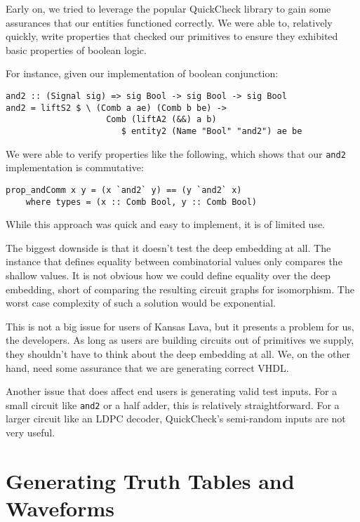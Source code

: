 \documentclass{llncs}
\begin{document}
Early on, we tried to leverage the popular QuickCheck library to gain some
assurances that our entities functioned correctly. We were able to, relatively
quickly, write properties that checked our primitives to ensure they
exhibited basic properties of boolean logic.

For instance, given our implementation of boolean conjunction:

\begin{verbatim}
and2 :: (Signal sig) => sig Bool -> sig Bool -> sig Bool
and2 = liftS2 $ \ (Comb a ae) (Comb b be) ->
                    Comb (liftA2 (&&) a b)
                       $ entity2 (Name "Bool" "and2") ae be
\end{verbatim}

We were able to verify properties like the following, which shows that our
\verb|and2| implementation is commutative:

\begin{verbatim}
prop_andComm x y = (x `and2` y) == (y `and2` x)
    where types = (x :: Comb Bool, y :: Comb Bool)
\end{verbatim}

While this approach was quick and easy to implement, it is of
limited use.

The biggest downside is that it doesn't test the deep
embedding at all. The instance that defines equality between
combinatorial values only compares the shallow values. It is
not obvious how we could define equality over the deep embedding,
short of comparing the resulting circuit graphs for isomorphism.
The worst case complexity of such a solution would be exponential.

This is not a big issue for users of Kansas Lava, but it presents
a problem for us, the developers. As long as users are building
circuits out of primitives we supply, they shouldn't have to
think about the deep embedding at all. We, on the other hand,
need some assurance that we are generating correct VHDL.

Another issue that does affect end users is generating valid test inputs. For
a small circuit like \verb|and2| or a half adder, this is
relatively straightforward. For a larger circuit like an LDPC
decoder, QuickCheck's semi-random inputs are not very useful.

\section{Generating Truth Tables and Waveforms}
\end{document}
